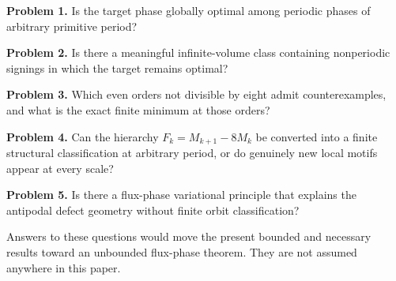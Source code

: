 \textbf{Problem 1.} Is the target phase globally optimal among periodic phases of
arbitrary primitive period?

\textbf{Problem 2.} Is there a meaningful infinite-volume class containing
nonperiodic signings in which the target remains optimal?

\textbf{Problem 3.} Which even orders not divisible by eight admit counterexamples,
and what is the exact finite minimum at those orders?

\textbf{Problem 4.} Can the hierarchy \(F_k=M_{k+1}-8M_k\) be converted into a finite
structural classification at arbitrary period, or do genuinely new local
motifs appear at every scale?

\textbf{Problem 5.} Is there a flux-phase variational principle that explains the
antipodal defect geometry without finite orbit classification?

Answers to these questions would move the present bounded and necessary
results toward an unbounded flux-phase theorem. They are not assumed anywhere
in this paper.

